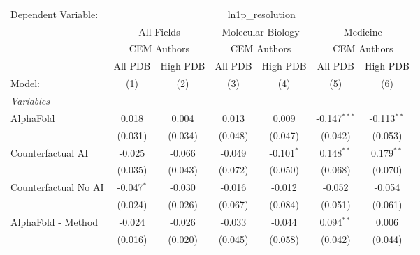 \begingroup
\centering
\begin{tabular}{lcccccc}
   \tabularnewline \midrule \midrule
   Dependent Variable: & \multicolumn{6}{c}{ln1p\_resolution}\\
 & \multicolumn{2}{c}{All Fields} & \multicolumn{2}{c}{Molecular Biology} & \multicolumn{2}{c}{Medicine} \\
\cmidrule(lr){2-3} \cmidrule(lr){4-5} \cmidrule(lr){6-7}
 & \multicolumn{2}{c}{CEM Authors} & \multicolumn{2}{c}{CEM Authors} & \multicolumn{2}{c}{CEM Authors} \\
\cmidrule(lr){2-3} \cmidrule(lr){4-5} \cmidrule(lr){6-7}
 & \multicolumn{1}{c}{All PDB} & \multicolumn{1}{c}{High PDB} & \multicolumn{1}{c}{All PDB} & \multicolumn{1}{c}{High PDB} & \multicolumn{1}{c}{All PDB} & \multicolumn{1}{c}{High PDB} \\
\cmidrule(lr){2-2} \cmidrule(lr){3-3} \cmidrule(lr){4-4} \cmidrule(lr){5-5} \cmidrule(lr){6-6} \cmidrule(lr){7-7}
   Model:                                                     & (1)          & (2)     & (3)           & (4)          & (5)            & (6)\\  
   \midrule
   \emph{Variables}\\
   AlphaFold                                                  & 0.018        & 0.004   & 0.013         & 0.009        & -0.147$^{***}$ & -0.113$^{**}$\\   
                                                              & (0.031)      & (0.034) & (0.048)       & (0.047)      & (0.042)        & (0.053)\\   
   Counterfactual AI                                          & -0.025       & -0.066  & -0.049        & -0.101$^{*}$ & 0.148$^{**}$   & 0.179$^{**}$\\   
                                                              & (0.035)      & (0.043) & (0.072)       & (0.050)      & (0.068)        & (0.070)\\   
   Counterfactual No AI                                       & -0.047$^{*}$ & -0.030  & -0.016        & -0.012       & -0.052         & -0.054\\   
                                                              & (0.024)      & (0.026) & (0.067)       & (0.084)      & (0.051)        & (0.061)\\   
   AlphaFold - Method                                         & -0.024       & -0.026  & -0.033        & -0.044       & 0.094$^{**}$   & 0.006\\   
                                                              & (0.016)      & (0.020) & (0.045)       & (0.058)      & (0.042)        & (0.044)\\   

\end{tabular}
